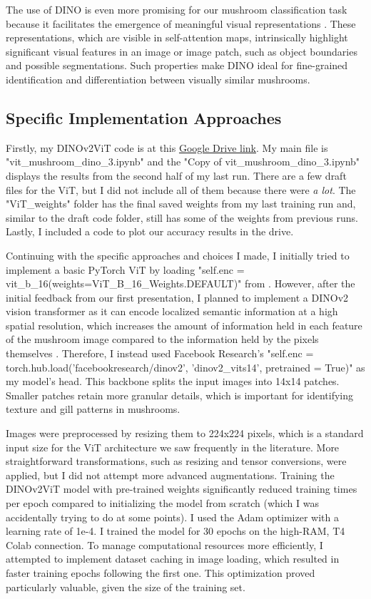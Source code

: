 \documentclass[journal]{IEEEtran}
\begin{document}
The use of DINO is even more promising for our mushroom classification task because it facilitates the emergence of meaningful visual representations \cite{DINOv2}. These representations, which are visible in self-attention maps, intrinsically highlight significant visual features in an image or image patch, such as object boundaries and possible segmentations. Such properties make DINO ideal for fine-grained identification and differentiation between visually similar mushrooms.

\subsection{Specific Implementation Approaches}
Firstly, my DINOv2ViT code is at this \href{https://drive.google.com/drive/folders/1nChekUzE9uQRjtYzLk8Mhjft8VtLLhTx?usp=drive_link}{Google Drive link}. My main file is "vit\_mushroom\_dino\_3.ipynb" and the "Copy of vit\_mushroom\_dino\_3.ipynb" displays the results from the second half of my last run. There are a few draft files for the ViT, but I did not include all of them because there were \textit{a lot}. The "ViT\_weights" folder has the final saved weights from my last training run and, similar to the draft code folder, still has some of the weights from previous runs. Lastly, I included a code to plot our accuracy results in the drive. 

Continuing with the specific approaches and choices I made, I initially tried to implement a basic PyTorch ViT by loading "self.enc = vit\_b\_16(weights=ViT\_B\_16\_Weights.DEFAULT)" from \cite{ViT}. However, after the initial feedback from our first presentation, I planned to implement a DINOv2 vision transformer as it can encode localized semantic information at a high spatial resolution, which increases the amount of information held in each feature of the mushroom image compared to the information held by the pixels themselves \cite{DINOv2}. Therefore, I instead used Facebook Research's "self.enc = torch.hub.load('facebookresearch/dinov2', 'dinov2\_vits14', pretrained = True)" as my model's head. This backbone splits the input images into 14x14 patches. Smaller patches retain more granular details, which is important for identifying texture and gill patterns in mushrooms.

Images were preprocessed by resizing them to 224x224 pixels, which is a standard input size for the ViT architecture we saw frequently in the literature. More straightforward transformations, such as resizing and tensor conversions, were applied, but I did not attempt more advanced augmentations. Training the DINOv2ViT model with pre-trained weights significantly reduced training times per epoch compared to initializing the model from scratch (which I was accidentally trying to do at some points). I used the Adam optimizer with a learning rate of 1e-4. I trained the model for 30 epochs on the high-RAM, T4 Colab connection. To manage computational resources more efficiently, I attempted to implement dataset caching in image loading, which resulted in faster training epochs following the first one. This optimization proved particularly valuable, given the size of the training set.
\end{document}

